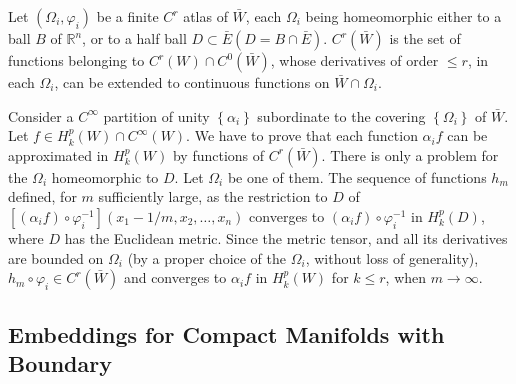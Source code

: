 \documentclass[12pt,hyperref,a4paper,UTF8]{ctexart}
\begin{document}
\begin{Proof}
Let $\left(\Omega_i, \varphi_i\right)$ be a finite $C^r$ atlas of $\bar{W}$, each $\Omega_i$ being homeomorphic either to a ball $B$ of $\mathbb{R}^n$, or to a half ball $D \subset \bar{E}(D=B \cap \bar{E})$. $C^r(\bar{W})$ is the set of functions belonging to $C^r(W) \cap C^0(\bar{W})$, whose derivatives of order $\leq r$, in each $\Omega_i$, can be extended to continuous functions on $\bar{W} \cap \Omega_i$.

\vskip 3pt
Consider a $C^{\infty}$ partition of unity $\left\{\alpha_i\right\}$ subordinate to the covering $\left\{\Omega_i\right\}$ of $\bar{W}$. Let $f \in H_k^p(W) \cap C^{\infty}(W)$. We have to prove that each function $\alpha_i f$ can be approximated in $H_k^p(W)$ by functions of $C^r(\bar{W})$. There is only a problem for the $\Omega_i$ homeomorphic to $D$. Let $\Omega_i$ be one of them.
The sequence of functions $h_m$ defined, for $m$ sufficiently large, as the restriction to $D$ of $\left[\left(\alpha_i f\right) \circ \varphi_i^{-1}\right]\left(x_1-1 / m, x_2, \ldots, x_n\right)$ converges to $\left(\alpha_i f\right) \circ \varphi_i^{-1}$ in $H_k^p(D)$, where $D$ has the Euclidean metric. Since the metric tensor, and all its derivatives are bounded on $\Omega_i$ (by a proper choice of the $\Omega_i$, without loss of generality), $h_m \circ \varphi_i \in C^r(\bar{W})$ and converges to $\alpha_i f$ in $H_k^p(W)$ for $k \leq r$, when $m \rightarrow \infty$.
\end{Proof}


\subsection{Embeddings for Compact Manifolds with Boundary}
\end{document}
